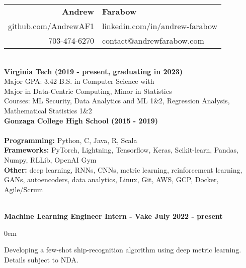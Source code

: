 \documentclass{article}
\begin{document}
\begin{center}
  \begin{tabular}{r l}
    {\huge\textbf{Andrew}}             & {\huge\textbf{Farabow}}        \\
    \hspace{35pt} github.com/AndrewAF1 & linkedin.com/in/andrew-farabow \\
    703-474-6270                       & contact@andrewfarabow.com      \\
  \end{tabular}


  \begin{flushleft}
    \begin{multicols}{2}
      {\large\textbf{\underline{}}} \\
      \textbf{Virginia Tech (2019 - present, graduating in 2023)} \\
      Major GPA: 3.42 \; B.S. in Computer Science with \\
      Major in Data-Centric Computing, Minor in Statistics \\
      Courses: ML Security, Data Analytics and ML 1\&2, Regression Analysis, Mathematical Statistics 1\&2 \\
      \textbf{Gonzaga College High School	(2015 - 2019)} \\


      \columnbreak
      {\large\textbf{\underline{}}} \\
      {\textbf{Programming:}} Python, C, Java, R, Scala \\
      {\textbf{Frameworks:}} PyTorch, Lightning, Tensorflow, Keras, Scikit-learn, Pandas, Numpy, RLLib, OpenAI Gym \\
      {\textbf{Other:}} deep learning, RNNs, CNNs, metric learning, reinforcement learning, GANs, autoencoders, data analytics, Linux, Git, AWS, GCP, Docker, Agile/Scrum \\ %

    \end{multicols}

    {\large\textbf{\underline{}}} \\

    \textbf{Machine Learning Engineer Intern - Vake \hfill July 2022 - present}
    \begin{compactitem}
      \itemsep0em
      \item Developing a few-shot ship-recognition algorithm using deep metric learning. Details subject to NDA.
    \end{compactitem}


\end{flushleft}
\end{center}
\end{document}
